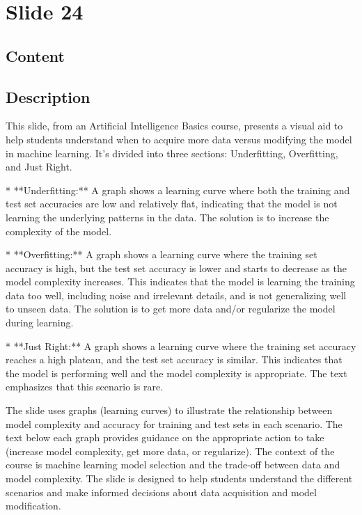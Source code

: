 \documentclass{article}%
\begin{document}
%
\newpage%
\section{Slide 24}%
\label{sec:Slide24}%
\subsection{Content}%
%
\subsection{Description}%
This slide, from an Artificial Intelligence Basics course, presents a visual aid to help students understand when to acquire more data versus modifying the model in machine learning.  It's divided into three sections: Underfitting, Overfitting, and Just Right.

* **Underfitting:**  A graph shows a learning curve where both the training and test set accuracies are low and relatively flat, indicating that the model is not learning the underlying patterns in the data.  The solution is to increase the complexity of the model.

* **Overfitting:** A graph shows a learning curve where the training set accuracy is high, but the test set accuracy is lower and starts to decrease as the model complexity increases. This indicates that the model is learning the training data too well, including noise and irrelevant details, and is not generalizing well to unseen data. The solution is to get more data and/or regularize the model during learning.

* **Just Right:** A graph shows a learning curve where the training set accuracy reaches a high plateau, and the test set accuracy is similar. This indicates that the model is performing well and the model complexity is appropriate.  The text emphasizes that this scenario is rare.

The slide uses graphs (learning curves) to illustrate the relationship between model complexity and accuracy for training and test sets in each scenario.  The text below each graph provides guidance on the appropriate action to take (increase model complexity, get more data, or regularize). The context of the course is machine learning model selection and the trade-off between data and model complexity.  The slide is designed to help students understand the different scenarios and make informed decisions about data acquisition and model modification.%
\end{document}
